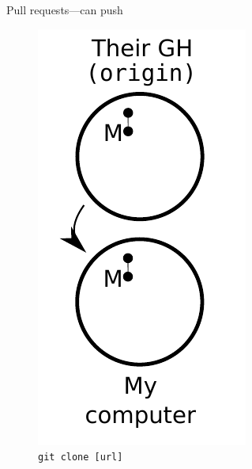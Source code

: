 \begin{frame}{Pull requests---can push}
  \begin{figure}
    \includegraphics{push_002.pdf}
    \\ \texttt{git clone [url]}
    \\ \texttt{}
  \end{figure}
\end{frame}

